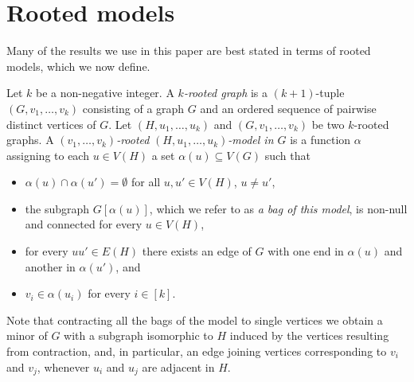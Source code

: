 \documentclass[reqno,final,12pt]{amsart}
\begin{document}
\section{Rooted models}\label{s:rooted}

Many of the results we use in this paper are best stated in terms of rooted models, which we now define. 

Let $k$ be a non-negative integer. A \emph{$k$-rooted graph} is a $(k+1)$-tuple $(G,v_1,\ldots,v_k)$ consisting of a graph $G$ and an ordered sequence of pairwise distinct vertices of $G$. Let $(H,u_1,\ldots,u_k)$ and $(G,v_1,\ldots,v_k)$ be two $k$-rooted graphs. 
A \emph{$(v_1,\ldots,v_k)$-rooted}  \emph{$(H,u_1,\ldots,u_k)$-model  in $G$} is a function $\alpha$ assigning to each $u \in V(H)$ a set $\alpha(u) \subseteq V(G)$  such that 
\begin{itemize}
\item $\alpha(u) \cap \alpha(u') = \emptyset$ for all $u,u' \in V(H)$,  $u \neq u'$,
	\item the subgraph $G[\alpha(u)]$, which we refer to as \emph{a bag of this model}, is non-null and connected for every $u \in V(H)$, 
	\item for every $uu' \in E(H)$ there exists an edge of $G$ with one end in $\alpha(u)$ and another in $\alpha(u')$, and
	\item $v_i \in \alpha(u_i)$ for every $i \in [k]$.
\end{itemize}
Note that contracting all the bags of the model to single vertices we obtain a minor of $G$ with a subgraph isomorphic to $H$ induced by the vertices resulting from contraction, and, in particular, an edge joining vertices corresponding to $v_i$ and $v_j$, whenever $u_i$ and $u_j$  are adjacent in $H$.
\end{document}
